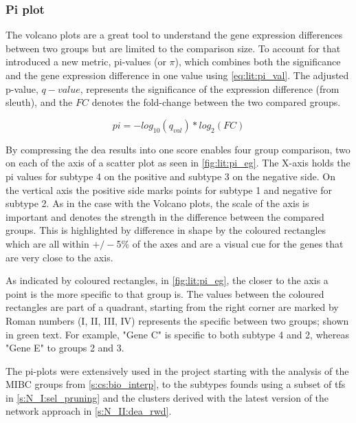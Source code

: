 \subsubsection{Pi plot} \label{s:lit:pi}

The volcano plots are a great tool to understand the gene expression differences between two groups but are limited to the comparison size. To account for that \cite{Xiao2014-zn} introduced a new metric, pi-values (or $\pi$), which combines both the significance and the gene expression difference in one value using \cref{eq:lit:pi_val}. The adjusted p-value, $q-value$, represents the significance of the expression difference (from sleuth), and the $FC$ denotes the fold-change between the two compared groups. 

\begin{equation} \label{eq:lit:pi_val}
    pi = - log_{10}(q_{val}) * log_{2}(FC)
\end{equation} 

By compressing the \acrshort{dea} results into one score enables four group comparison, two on each of the axis of a scatter plot as seen in \cref{fig:lit:pi_eg}. The X-axis holds the pi values for subtype 4 on the positive and subtype 3 on the negative side. On the vertical axis the positive side marks points for subtype 1 and negative for subtype 2. As in the case with the Volcano plots, the scale of the axis is important and denotes the strength in the difference between the compared groups. This is highlighted by difference in shape by the coloured rectangles which are all within $+/-$5\% of the axes and are a visual cue for the genes that are very close to the axis.

As indicated by coloured rectangles, in \cref{fig:lit:pi_eg}, the closer to the axis a point is the more specific to that group is. The values between the coloured rectangles are part of a quadrant, starting from the right corner are marked by Roman numbers (I, II, III, IV) represents the specific between two groups; shown in green text. For example, "Gene C" is specific to both subtype 4 and 2, whereas "Gene E" to groups 2 and 3. 

The pi-plots were extensively used in the project starting with the analysis of the MIBC groups from \cref{s:cs:bio_interp}, to the subtypes founds using a subset of \acrlong{tf}s in \cref{s:N_I:sel_pruning} and the clusters derived with the latest version of the network approach in \cref{s:N_II:dea_rwd}.

